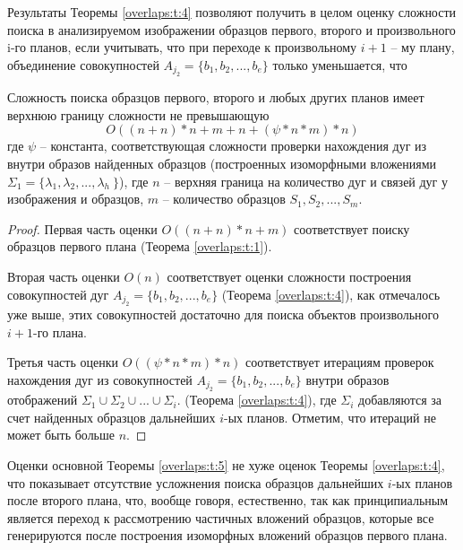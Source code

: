 Результаты  Теоремы \ref{overlaps:t:4}   позволяют получить в целом оценку сложности поиска в анализируемом изображении образцов первого, второго и произвольного i-го планов, если учитывать, что  при переходе к произвольному $i+1$ -- му плану, объединение совокупностей  $A_{j_2}  =  \{ b_1, b_2 ,..., b_e\}$  только уменьшается, что  

\begin{theorem}
Сложность поиска образцов первого, второго и любых других планов имеет верхнюю границу сложности не превышающую  
\begin{equation}
O((n+n)*n+m+n+(\psi*n*m)*n)
\label{overlaps:11}
\end{equation}
где  $\psi$ -- константа, соответствующая сложности проверки нахождения дуг из   внутри  образов найденных образцов (построенных изоморфными вложениями $\Sigma_1  =  \{\lambda_1, \lambda_2 ,..., \lambda_h\ \}$), где  $n$ -- верхняя граница на количество дуг и связей дуг у изображения и образцов,  $m$ -- количество образцов  $S_1, S_2, ..., S_m$.
\label{overlaps:t:5}
\end{theorem}    

\begin{proof}
Первая часть оценки  $O((n+n)*n+m)$  соответствует поиску образцов первого плана (Теорема \ref{overlaps:t:1}).  

Вторая часть оценки  $O(n)$   соответствует оценки сложности построения совокупностей дуг $A_{j_2}  =  \{ b_1, b_2 ,..., b_e\}$ (Теорема \ref{overlaps:t:4}), как отмечалось уже выше, этих совокупностей достаточно для поиска объектов произвольного  $i+1$-го  плана.  

Третья часть оценки  $O((\psi*n*m)*n)$   соответствует итерациям проверок нахождения дуг из совокупностей  $A_{j_2}  =  \{ b_1, b_2 ,..., b_e\}$   внутри  образов отображений  $\Sigma_1\cup\Sigma_2\cup ...\cup \Sigma_i$. (Теорема \ref{overlaps:t:4}), где  $\Sigma_i$  добавляются за счет найденных образцов дальнейших  $i$-ых  планов.
Отметим, что итераций не может быть больше  $n$.
\end{proof}
 
\begin{remark}
Оценки основной Теоремы \ref{overlaps:t:5} не хуже   оценок Теоремы \ref{overlaps:t:4}, что показывает отсутствие усложнения поиска образцов дальнейших $i$-ых  планов после второго плана, что, вообще говоря, естественно, так как принципиальным является переход к рассмотрению частичных вложений образцов, которые все генерируются после построения изоморфных вложений образцов первого плана.
\end{remark}



